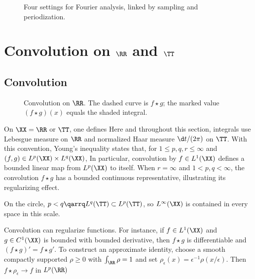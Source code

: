 \begin{figure}[tbp]
\centering
{}
\caption{Four settings for Fourier analysis, linked by sampling and periodization.}
\label{fig-fourier-transforms}
\end{figure}



                                                
                                                
                                                
\section{Convolution on \texorpdfstring{$\RR$ and $\TT$}{the Line and the Circle}}

                                                
\subsection{Convolution}

\begin{figure}[tbp]
\centering
{}
\caption{Convolution on $\RR$. The dashed curve is $f\star g$; the marked value $(f\star g)(x)$ equals the shaded integral.}
\label{fig-review-fourier-convolution}
\end{figure}
On $\XX=\RR$ or $\TT$, one defines 
Here and throughout this section, integrals use Lebesgue measure on $\RR$ and normalized Haar measure $\d t/(2\pi)$ on $\TT$. With this convention, Young's inequality states that, for $1\leq p,q,r\leq\infty$ and $(f,g)\in L^p(\XX)\times L^q(\XX)$,
In particular, convolution by $f\in L^1(\XX)$ defines a bounded linear map from $L^p(\XX)$ to itself. When $r=\infty$ and $1<p,q<\infty$, the convolution $f\star g$ has a bounded continuous representative, illustrating its regularizing effect.
 
On the circle, $p<q \qarrq L^q(\TT) \subset L^p(\TT)$, so $L^\infty(\XX)$ is contained in every space in this scale.



Convolution can regularize functions. For instance, if $f \in L^1(\XX)$ and $g\in C^1(\XX)$ is bounded with bounded derivative, then $f \star g$ is differentiable and $(f \star g)'=f \star g'$. To construct an approximate identity, choose a smooth compactly supported $\rho\geq0$ with $\int_\RR\rho=1$ and set $\rho_\epsilon(x)=\epsilon^{-1}\rho(x/\epsilon)$. Then $f\star\rho_\epsilon\to f$ in $L^p(\RR)$